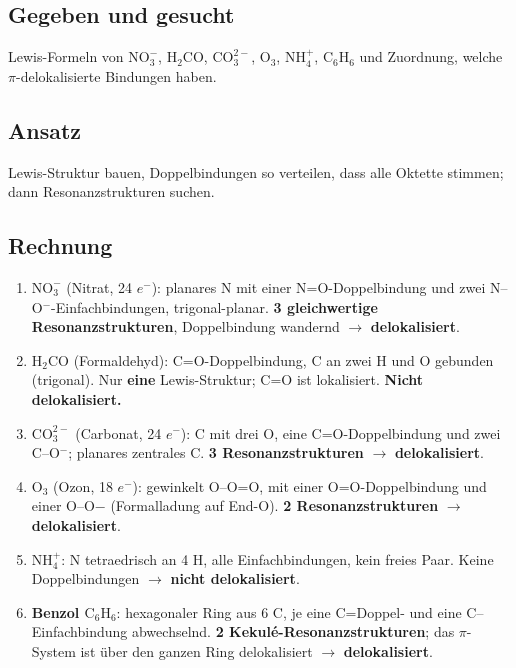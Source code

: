 
\subsection*{Gegeben und gesucht}
Lewis-Formeln von $\mathrm{NO_3^-}$, $\mathrm{H_2CO}$, $\mathrm{CO_3^{2-}}$,
$\mathrm{O_3}$, $\mathrm{NH_4^+}$, $\mathrm{C_6H_6}$ und Zuordnung, welche
$\pi$-delokalisierte Bindungen haben.

\subsection*{Ansatz}
Lewis-Struktur bauen, Doppelbindungen so verteilen, dass alle Oktette
stimmen; dann Resonanzstrukturen suchen.

\subsection*{Rechnung}
\begin{enumerate}
  \item[a)] \textbf{$\mathrm{NO_3^-}$} (Nitrat, 24 $e^-$): planares N mit
        einer N=O-Doppelbindung und zwei N--O$^-$-Einfachbindungen,
        trigonal-planar. \textbf{3 gleichwertige Resonanzstrukturen},
        Doppelbindung wandernd $\rightarrow$ \textbf{delokalisiert}.
  \item[b)] \textbf{$\mathrm{H_2CO}$} (Formaldehyd): C=O-Doppelbindung,
        C an zwei H und O gebunden (trigonal). Nur \textbf{eine}
        Lewis-Struktur; C=O ist lokalisiert. \textbf{Nicht
        delokalisiert.}
  \item[c)] \textbf{$\mathrm{CO_3^{2-}}$} (Carbonat, 24 $e^-$): C mit
        drei O, eine C=O-Doppelbindung und zwei C--O$^-$; planares
        zentrales C. \textbf{3 Resonanzstrukturen} $\rightarrow$
        \textbf{delokalisiert}.
  \item[d)] \textbf{$\mathrm{O_3}$} (Ozon, 18 $e^-$): gewinkelt
        O--O=O, mit einer O=O-Doppelbindung und einer O--O$-$
        (Formalladung auf End-O). \textbf{2 Resonanzstrukturen}
        $\rightarrow$ \textbf{delokalisiert}.
  \item[e)] \textbf{$\mathrm{NH_4^+}$}: N tetraedrisch an 4 H, alle
        Einfachbindungen, kein freies Paar. Keine
        Doppelbindungen $\rightarrow$ \textbf{nicht delokalisiert}.
  \item[f)] \textbf{Benzol $\mathrm{C_6H_6}$}: hexagonaler Ring aus
        6 C, je eine C=Doppel- und eine C--Einfachbindung abwechselnd.
        \textbf{2 Kekul\'e-Resonanzstrukturen}; das $\pi$-System ist \"uber
        den ganzen Ring delokalisiert $\rightarrow$ \textbf{delokalisiert}.
\end{enumerate}

